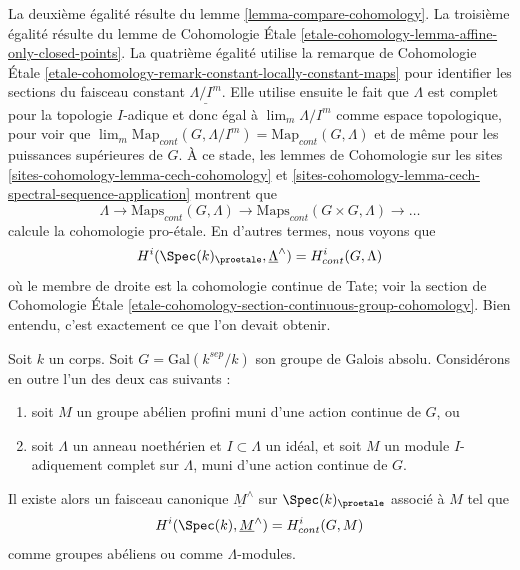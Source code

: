 La deuxième égalité résulte du lemme \ref{lemma-compare-cohomology}.
La troisième égalité résulte du lemme de Cohomologie \'Etale
\ref{etale-cohomology-lemma-affine-only-closed-points}.
La quatrième égalité utilise
la remarque de Cohomologie \'Etale
\ref{etale-cohomology-remark-constant-locally-constant-maps}
pour identifier les sections du faisceau constant $\underline{\Lambda/I^m}$.
Elle utilise ensuite le fait que $\Lambda$ est complet pour la topologie $I$-adique
et donc égal à $\lim_m \Lambda/I^m$ comme espace topologique, pour voir que
$\lim_m \text{Map}_{cont}(G, \Lambda/I^m) = \text{Map}_{cont}(G, \Lambda)$
et de même pour les puissances supérieures de $G$.
À ce stade, les lemmes de Cohomologie sur les sites
\ref{sites-cohomology-lemma-cech-cohomology}  et
\ref{sites-cohomology-lemma-cech-spectral-sequence-application}
montrent que
$$
\Lambda \to \text{Maps}_{cont}(G, \Lambda) \to
\text{Maps}_{cont}(G \times G, \Lambda) \to \ldots
$$
calcule la cohomologie pro-\'etale. En d'autres termes, nous voyons que
$$
H^i(\Spec(k)_\proetale, \underline{\Lambda}^\wedge)
=
H^i_{cont}(G, \Lambda)
$$
où le membre de droite est la cohomologie continue de Tate; voir la
section de Cohomologie \'Etale
\ref{etale-cohomology-section-continuous-group-cohomology}.
Bien entendu, c'est exactement ce que l'on devait obtenir.

\begin{lemma}
\label{lemma-more-general-point}
Soit $k$ un corps. Soit $G = \text{Gal}(k^{sep}/k)$ son groupe de
Galois absolu. Considérons en outre l'un des deux cas suivants :
\begin{enumerate}
\item soit $M$ un groupe abélien profini muni d'une action continue
de $G$, ou
\item soit $\Lambda$ un anneau noethérien et $I \subset \Lambda$ un idéal,
et soit $M$ un module $I$-adiquement complet sur $\Lambda$, muni d'une action continue
de $G$.
\end{enumerate}
Il existe alors un faisceau canonique $\underline{M}^\wedge$ sur
$\Spec(k)_\proetale$ associé à $M$ tel que
$$
H^i(\Spec(k), \underline{M}^\wedge) = H^i_{cont}(G, M)
$$
comme groupes abéliens ou comme $\Lambda$-modules.
\end{lemma}


